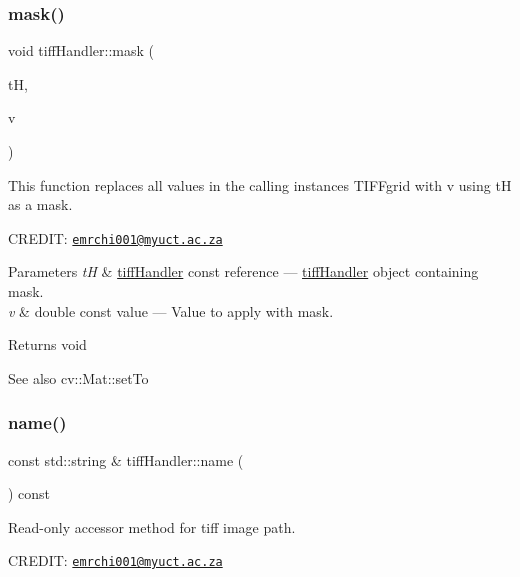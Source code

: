 \subsubsection{\texorpdfstring{mask()}{mask()}}
{\footnotesize\ttfamily void tiff\+Handler\+::mask (\begin{DoxyParamCaption}\item[{const \hyperlink{classtiffHandler}{tiff\+Handler} \&}]{tH,  }\item[{const double}]{v }\end{DoxyParamCaption})}



This function replaces all values in the calling instance\textquotesingle{}s T\+I\+F\+Fgrid with v using tH as a mask. 

C\+R\+E\+D\+IT\+: \href{mailto:emrchi001@myuct.ac.za}{\tt emrchi001@myuct.\+ac.\+za}


\begin{DoxyParams}{Parameters}
{\em tH} & \hyperlink{classtiffHandler}{tiff\+Handler} const reference --- \hyperlink{classtiffHandler}{tiff\+Handler} object containing mask. \\
\hline
{\em v} & double const value --- Value to apply with mask.\\
\hline
\end{DoxyParams}
\begin{DoxyReturn}{Returns}
void
\end{DoxyReturn}
\begin{DoxySeeAlso}{See also}
cv\+::\+Mat\+::set\+To 
\end{DoxySeeAlso}
\mbox{\label{classtiffHandler_add034c87811bd7c35234fdd3b2a0ada7}} 
\subsubsection{\texorpdfstring{name()}{name()}}
{\footnotesize\ttfamily const std\+::string \& tiff\+Handler\+::name (\begin{DoxyParamCaption}\item[{void}]{ }\end{DoxyParamCaption}) const}



Read-\/only accessor method for tiff image path. 

C\+R\+E\+D\+IT\+: \href{mailto:emrchi001@myuct.ac.za}{\tt emrchi001@myuct.\+ac.\+za}

